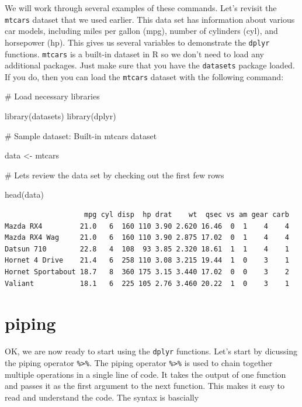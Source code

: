 \documentclass[
  letterpaper,
  DIV=11,
  numbers=noendperiod]{scrreprt}
\newenvironment{Shaded}{\begin{snugshade}}{\end{snugshade}}
\newcommand{\CommentTok}[1]{\textcolor[rgb]{0.37,0.37,0.37}{#1}}
\newcommand{\FunctionTok}[1]{\textcolor[rgb]{0.28,0.35,0.67}{#1}}
\newcommand{\NormalTok}[1]{\textcolor[rgb]{0.00,0.23,0.31}{#1}}
\newcommand{\OtherTok}[1]{\textcolor[rgb]{0.00,0.23,0.31}{#1}}
\begin{document}
We will work through several examples of these commands. Let's revisit
the \texttt{mtcars} dataset that we used earlier. This data set has
information about various car models, including miles per gallon (mpg),
number of cylinders (cyl), and horsepower (hp). This gives us several
variables to demonstrate the \texttt{dplyr} functions. \texttt{mtcars}
is a built-in dataset in R so we don't need to load any additional
packages. Just make sure that you have the \texttt{datasets} package
loaded. If you do, then you can load the \texttt{mtcars} dataset with
the following command:

\begin{Shaded}
\begin{Highlighting}[]
\CommentTok{\# Load necessary libraries}

\FunctionTok{library}\NormalTok{(datasets)}
\FunctionTok{library}\NormalTok{(dplyr)}

\CommentTok{\# Sample dataset: Built{-}in mtcars dataset}

\NormalTok{data }\OtherTok{\textless{}{-}}\NormalTok{ mtcars}

\CommentTok{\# Let\textquotesingle{}s review the data set by checking out the first few rows}

\FunctionTok{head}\NormalTok{(data)}
\end{Highlighting}
\end{Shaded}

\begin{verbatim}
                   mpg cyl disp  hp drat    wt  qsec vs am gear carb
Mazda RX4         21.0   6  160 110 3.90 2.620 16.46  0  1    4    4
Mazda RX4 Wag     21.0   6  160 110 3.90 2.875 17.02  0  1    4    4
Datsun 710        22.8   4  108  93 3.85 2.320 18.61  1  1    4    1
Hornet 4 Drive    21.4   6  258 110 3.08 3.215 19.44  1  0    3    1
Hornet Sportabout 18.7   8  360 175 3.15 3.440 17.02  0  0    3    2
Valiant           18.1   6  225 105 2.76 3.460 20.22  1  0    3    1
\end{verbatim}

\section*{piping}\label{piping}


OK, we are now ready to start using the \texttt{dplyr} functions. Let's
start by dicussing the piping operator \texttt{\%\textgreater{}\%}. The
piping operator \texttt{\%\textgreater{}\%} is used to chain together
multiple operations in a single line of code. It takes the output of one
function and passes it as the first argument to the next function. This
makes it easy to read and understand the code. The syntax is bascially
\end{document}
